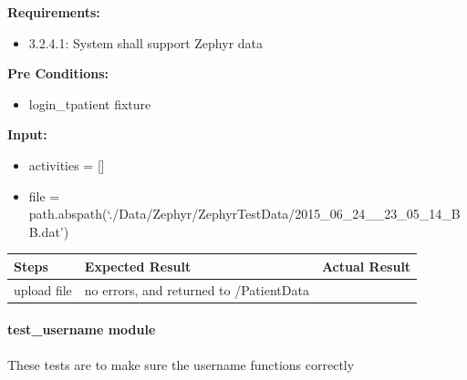 \documentclass[letterpaper,10pt,english]{sphinxmanual}
\begin{document}
\begin{fulllineitems}
\label{STD/test_upload:test_upload.test_zephyr_data_upload}
\textbf{Requirements:}
\begin{itemize}
\item {} 
3.2.4.1: System shall support Zephyr data

\end{itemize}

\textbf{Pre Conditions:}
\begin{itemize}
\item {} 
login\_tpatient fixture

\end{itemize}

\textbf{Input:}
\begin{itemize}
\item {} 
activities = {[}{]}

\item {} 
file = path.abspath(`./Data/Zephyr/ZephyrTestData/2015\_06\_24\_\_23\_05\_14\_BB.dat')

\end{itemize}

\begin{tabulary}{\linewidth}{|L|L|L|}
\hline
\textsf{\relax 
Steps
} & \textsf{\relax 
Expected Result
} & \textsf{\relax 
Actual Result
}\\
\hline
upload file
 & 
no errors, and returned to /PatientData
 & \\
\hline\end{tabulary}


\end{fulllineitems}



\paragraph{test\_username module}
\label{STD/test_username:module-test_username}\label{STD/test_username::doc}\label{STD/test_username:test-username-module}
These tests are to make sure the username functions correctly
\end{document}
